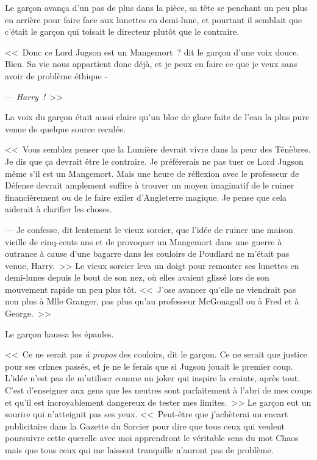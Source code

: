 Le garçon avança d'un pas de plus dans la pièce, sa tête se penchant un peu plus en arrière pour faire face aux lunettes en demi-lune, et pourtant il semblait que c'était le garçon qui toisait le directeur plutôt que le contraire.

<<~Donc ce Lord Jugson est un Mangemort~? dit le garçon d'une voix douce. Bien. Sa vie nous appartient donc déjà, et je peux en faire ce que je veux sans avoir de problème éthique -

--- \emph{Harry~!}~>>

La voix du garçon était aussi claire qu'un bloc de glace faite de l'eau la plus pure venue de quelque source reculée.

<<~Vous semblez penser que la Lumière devrait vivre dans la peur des Ténèbres. Je dis que ça devrait être le contraire. Je préférerais ne pas tuer ce Lord Jugson même s'il est un Mangemort. Mais une heure de réflexion avec le professeur de Défense devrait amplement suffire à trouver un moyen imaginatif de le ruiner financièrement ou de le faire exiler d'Angleterre magique. Je pense que cela aiderait à clarifier les choses.

--- Je confesse, dit lentement le vieux sorcier, que l'idée de ruiner une maison vieille de cinq-cents ans et de provoquer un Mangemort dans une guerre à outrance à cause d'une bagarre dans les couloirs de Poudlard ne m'était pas venue, Harry.~>> Le vieux sorcier leva un doigt pour remonter ses lunettes en demi-lunes depuis le bout de son nez, où elles avaient glissé lors de son mouvement rapide un peu plus tôt. <<~J'ose avancer qu'elle ne viendrait pas non plus à Mlle Granger, pas plus qu'au professeur McGonagall ou à Fred et à George.~>>

Le garçon haussa les épaules.

<<~Ce ne serait pas \emph{à propos} des couloirs, dit le garçon. Ce ne serait que justice pour ses crimes passés, et je ne le ferais que si Jugson jouait le premier coup. L'idée n'est pas de m'utiliser comme un joker qui inspire la crainte, après tout. C'est d'enseigner aux gens que les neutres sont parfaitement à l'abri de mes coups et qu'il est incroyablement dangereux de tester mes limites.~>> Le garçon eut un sourire qui n'atteignit pas ses yeux. <<~Peut-être que j'achèterai un encart publicitaire dans la Gazette du Sorcier pour dire que tous ceux qui veulent poursuivre cette querelle avec moi apprendront le véritable sens du mot Chaos mais que tous ceux qui me laissent tranquille n'auront pas de problème.


